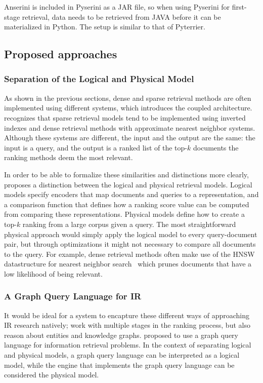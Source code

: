 Anserini is included in Pyserini as a JAR file, so when using Pyserini for first-stage retrieval, data needs to be retrieved from JAVA before it can be materialized in Python. The setup is similar to that of Pyterrier. 

\subsection{Proposed approaches}
\subsubsection{Separation of the Logical and Physical Model}
As shown in the previous sections, dense and sparse retrieval methods are often implemented using different  systems, which  introduces the coupled architecture. \citet{seperation-logical-physical} recognizes that sparse retrieval models tend to be implemented using inverted indexes and dense retrieval methods with approximate nearest neighbor systems. Although these systems are different, the input and the output are the same: the input is a query, and the output is a ranked list of the top-$k$ documents the ranking methods deem the most relevant. 

In order to be able to formalize these similarities and distinctions more clearly, \citeauthor{seperation-logical-physical} proposes a distinction between the logical and physical retrieval models. Logical models specify encoders that map documents and queries to a representation, and a comparison function that defines how a ranking score value can be computed from comparing these representations. Physical models define how to create a top-$k$ ranking from a large corpus given a query. The most straightforward physical approach would simply apply the logical model to every query-document pair, but through optimizations it might not necessary to compare all documents to the query. For example, dense retrieval methods often make use of the HNSW datastructure for nearest neighbor search~\citep{faiss} which prunes documents that have a low likelihood of being relevant. 

\subsubsection{A Graph Query Language for IR}
It would be ideal for a system to encapture these different ways of approaching IR research natively; work with multiple stages in the ranking process, but also reason about entities and knowledge graphs. 
\citet{need-graph-db} proposed to use a graph query language for information retrieval problems. In the context of separating logical and physical models, a graph query language can be interpreted as a logical model, while the engine that implements the graph query language can be considered the physical model.

